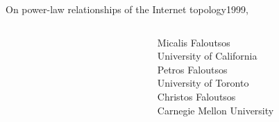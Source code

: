 \documentclass[ngerman,compress,hyperref={bookmarks}]{beamer}
\begin{document}
\begin{frame}{On power-law relationships of the Internet topology}{1999, \cite{Faloutsos:1999:PRI:316194.316229}}
\begin{columns}[c]
\begin{column}{0.1\textwidth}
\begin{figure}
        \label{faloutsos}
      \end{figure}
    \end{column}
    \begin{column}{0.3\textwidth}
      {\scriptsize Micalis Faloutsos\\
      \vspace{0.1cm}
      University of California\\
      \vspace{0.8cm}
      Petros Faloutsos\\
      \vspace{0.1cm}
      University of Toronto\\
      \vspace{0.7cm}
      Christos Faloutsos\\
      \vspace{0.1cm}
      Carnegie Mellon University\\ }
    \end{column}
  \end{columns}
\end{frame}
\end{document}
